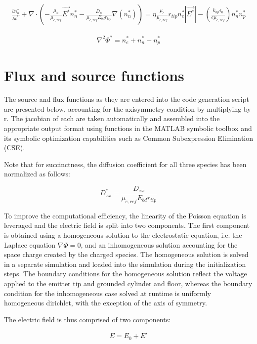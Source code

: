 \documentclass[12pt, a4paper]{report}
\begin{document}
\begin{align*}
        \frac{\partial n_n^* }{\partial t^*} + \nabla \cdot \left(-\frac{\mu_n}{\mu_{e,ref}} \vec{E^*}n_n^* - \frac{{D_n}}{\mu_{e,ref} E_{bd}r_{tip}}\nabla (n_n^*)\right) = \eta \frac{\mu_e}{\mu_{e,ref}}r_{tip} n_e^*|\vec{E^*}| - \left(\frac{k_{np} \epsilon_0}{e \mu_{e,ref}} \right) n_n^*n_p^*
\end{align*}

\begin{align*}
    \nabla^2\Phi^* = n_e^*+n_n^*-n_p^*
\end{align*}

\section{Flux and source functions}
The source and flux functions as they are entered into the code generation script are presented below, accounting for the axisymmetry condition by multiplying by r. The jacobian of each are taken automatically and assembled into the appropriate output format using functions in the MATLAB symbolic toolbox and its symbolic optimization capabilities such as Common Subexpression Elimination (CSE).

Note that for succinctness, the diffusion coefficient for all three species has been normalized as follows:

\begin{equation*}
    D_{xx}^* = \frac{D_{xx}}{\mu_{e,ref}E_{bd}r_{tip}}
\end{equation*}

To improve the computational efficiency, the linearity of the Poisson equation is leveraged and the electric field is split into two components. The first component is obtained using a homogeneous solution to the electrostatic equation, i.e. the Laplace equation $\nabla \Phi = 0$, and an inhomogeneous solution accounting for the space charge created by the charged species. The homogeneous solution is solved in a separate simulation and loaded into the simulation during the initialization steps. The boundary conditions for the homogeneous solution reflect the voltage applied to the emitter tip and grounded cylinder and floor, whereas the boundary condition for the inhomogeneous case solved at runtime is uniformly homogeneous dirichlet, with the exception of the axis of symmetry.

The electric field is thus comprised of two components:

\begin{align*}
    E = E_0 + E'
\end{align*}
\end{document}
